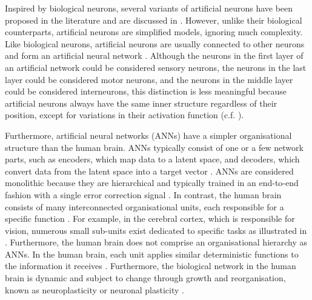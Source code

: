 Inspired by biological neurons, several variants of artificial neurons have been proposed in the literature and are discussed in .
However, unlike their biological counterparts, artificial neurons are simplified models, ignoring much complexity. Like biological neurons, artificial neurons are usually connected to other neurons and form an artificial neural network . Although the neurons in the first layer of an artificial network could be considered sensory neurons, the neurons in the last layer could be considered motor neurons, and the neurons in the middle layer could be considered interneurons, this distinction is less meaningful because artificial neurons always have the same inner structure regardless of their position, except for variations in their activation function (c.f. ).

Furthermore, artificial neural networks (ANNs) have a simpler organisational structure than the human brain. ANNs typically consist of one or a few network parts, such as encoders, which map data to a latent space, and decoders, which convert data from the latent space into a target vector . ANNs are considered monolithic because they are hierarchical and typically trained in an end-to-end fashion with a single error correction signal . In contrast, the human brain consists of many interconnected organisational units, each responsible for a specific function . For example, in the cerebral cortex, which is responsible for vision, numerous small sub-units exist dedicated to specific tasks as illustrated in .
Furthermore, the human brain does not comprise an organisational hierarchy as ANNs. In the human brain, each unit applies similar deterministic functions to the information it receives . Furthermore, the biological network in the human brain is dynamic and subject to change through growth and reorganisation, known as neuroplasticity or neuronal plasticity .

